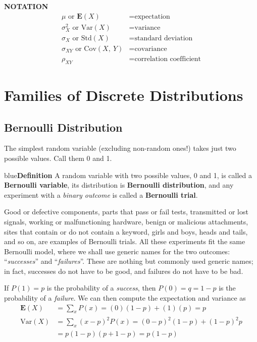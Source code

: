 \documentclass{article}
\newenvironment{definition}[1]{\begin{mybox}{blue}{\textbf{Definition #1}}}{\end{mybox}}
\begin{document}
\textbf{NOTATION}
\begin{align*}
    \mu \text{ or } \mathbf{E}(X) &= \text{expectation}\\
    \sigma_X^2 \text{ or Var}(X) &= \text{variance}\\
    \sigma_X \text{ or Std}(X) &= \text{standard deviation}\\
    \sigma_{XY} \text{ or Cov}(X,\ Y) &= \text{covariance}\\
    \rho_{XY} &= \text{correlation coefficient}
\end{align*}


\section{Families of Discrete Distributions}

\subsection{Bernoulli Distribution}

The simplest random variable (excluding non-random ones!) takes just two possible values. Call them 0 and 1.

\begin{definition}{}
A random variable with two possible values, 0 and 1, is called a \textbf{Bernoulli variable}, its distribution is \textbf{Bernoulli distribution}, and any experiment with a \textit{binary outcome} is called a \textbf{Bernoulli trial}.
\end{definition}

Good or defective components, parts that pass or fail tests, transmitted or lost signals, working or malfunctioning hardware, benign or malicious attachments, sites that contain or do not contain a keyword, girls and boys, heads and tails, and so on, are examples of Bernoulli trials. All these experiments fit the same Bernoulli model, where we shall use generic names for the two outcomes: ``\textit{successes}'' and ``\textit{failures}''. These are nothing but commonly used generic names; in fact, successes do not have to be good, and failures do not have to be bad.

If $P(1) = p$ is the probability of a \textit{success}, then $P(0) = q = 1 - p$ is the probability of a \textit{failure}. We can then compute the expectation and variance as
\begin{align*}
    \mathbf{E}(X) &= \sum_{x} P(x) = (0)(1-p) + (1)(p) = p\\
    \text{Var}(X) &= \sum_{x} (x-p)^2P(x) = (0-p)^2(1-p) + (1-p)^2p\\
    &= p(1-p)(p+1-p) = p(1-p)
\end{align*}
\end{document}
